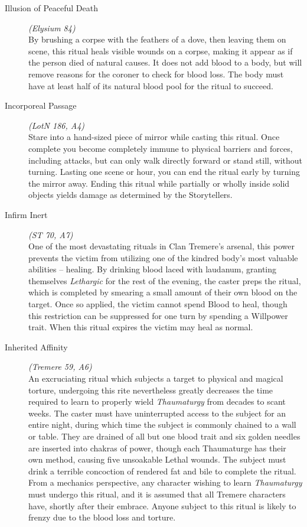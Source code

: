 \begin{description}
	\item[Illusion of Peaceful Death] \emph{(Elysium 84)} \hfill \\
	By brushing a corpse with the feathers of a dove, then leaving them on scene, this ritual heals visible wounds on a corpse, making 
	it appear as if the person died of natural causes.  It does not add blood to a body, but will remove reasons for the coroner to 
	check for blood loss.  The body must have at least half of its natural blood pool for the ritual to succeed. \\

	\item[Incorporeal Passage] \emph{(LotN 186, A4)} \hfill \\
	Stare into a hand-sized piece of mirror while casting this ritual.  Once complete you become completely immune to physical barriers 
	and forces, including attacks, but can only walk directly forward or stand still, without turning.  Lasting one scene or hour, 
	you can end the ritual early by turning the mirror away.  Ending this ritual while partially or wholly inside solid objects 
	yields damage as determined by the Storytellers. \\

	\item[Infirm Inert] \emph{(ST 70, A7)} \hfill \\
	One of the most devastating rituals in Clan Tremere's arsenal, this power prevents the victim from utilizing one of the kindred 
	body's most valuable abilities -- healing.  By drinking blood laced with laudanum, granting themselves \emph{Lethargic} for the 
	rest of the evening, the caster preps the ritual, which is completed by smearing a small amount of their own blood on the target.  
	Once so applied, the victim cannot spend Blood to heal, though this restriction can be suppressed for one turn by spending a 
	Willpower trait.  When this ritual expires the victim may heal as normal. \\

	\item[Inherited Affinity] \emph{(Tremere 59, A6)} \hfill \\
	An excruciating ritual which subjects a target to physical and magical torture, undergoing this rite nevertheless greatly decreases 
	the time required to learn to properly wield \emph{Thaumaturgy} from decades to scant weeks.  The caster must have uninterrupted 
	access to the subject for an entire night, during which time the subject is commonly chained to a wall or table.  They are drained 
	of all but one blood trait and six golden needles are inserted into chakras of power, though each Thaumaturge has their own method, 
	causing five unsoakable Lethal wounds. The subject must drink a terrible concoction of rendered fat and bile to complete the ritual.  
	From a mechanics perspective, any character wishing to learn \emph{Thaumaturgy} must undergo this ritual, and it is assumed that all 
	Tremere characters have, shortly after their embrace.  Anyone subject to this ritual is likely to frenzy due to the blood loss and torture. \\


\end{description}
